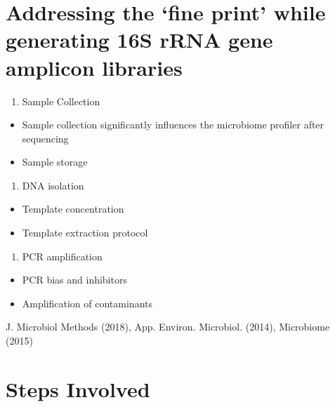 \documentclass[
]{book}
\providecommand{\tightlist}{%
  \setlength{\itemsep}{0pt}\setlength{\parskip}{0pt}}
\begin{document}
\hypertarget{addressing-the-fine-print-while-generating-16s-rrna-gene-amplicon-libraries}{%
\section{Addressing the `fine print' while generating 16S rRNA gene amplicon libraries}\label{addressing-the-fine-print-while-generating-16s-rrna-gene-amplicon-libraries}}

\begin{enumerate}
\def\labelenumi{\arabic{enumi}.}
\tightlist
\item
  Sample Collection
\end{enumerate}

\begin{itemize}
\tightlist
\item
  Sample collection significantly influences the microbiome profiler
  after sequencing
\item
  Sample storage
\end{itemize}

\begin{enumerate}
\def\labelenumi{\arabic{enumi}.}
\setcounter{enumi}{1}
\tightlist
\item
  DNA isolation
\end{enumerate}

\begin{itemize}
\tightlist
\item
  Template concentration
\item
  Template extraction protocol
\end{itemize}

\begin{enumerate}
\def\labelenumi{\arabic{enumi}.}
\setcounter{enumi}{2}
\tightlist
\item
  PCR amplification
\end{enumerate}

\begin{itemize}
\tightlist
\item
  PCR bias and inhibitors
\item
  Amplification of contaminants
\end{itemize}

J. Microbiol Methods (2018), App. Environ. Microbiol. (2014), Microbiome (2015)

\hypertarget{steps-involved}{%
\section{Steps Involved}\label{steps-involved}}
\end{document}
